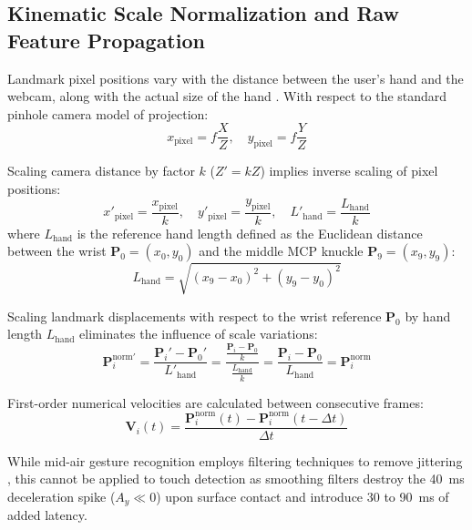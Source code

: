 \subsection{Kinematic Scale Normalization and Raw Feature Propagation}
\label{subsec:lit_scale_norm}
Landmark pixel positions vary with the distance between the user's hand and the webcam, along with the actual size of the hand \cite{Doan2022Efficient, Kumar2026Hybrid}. With respect to the standard pinhole camera model of projection:
\begin{equation}
x_{\text{pixel}} = f \frac{X}{Z}, \quad y_{\text{pixel}} = f \frac{Y}{Z}
\label{eq:pinhole_projection}
\end{equation}

Scaling camera distance by factor $k$ ($Z' = k Z$) implies inverse scaling of pixel positions:
\begin{equation}
x'_{\text{pixel}} = \frac{x_{\text{pixel}}}{k}, \quad y'_{\text{pixel}} = \frac{y_{\text{pixel}}}{k}, \quad L'_{\text{hand}} = \frac{L_{\text{hand}}}{k}
\label{eq:pixel_scaling}
\end{equation}
where $L_{\text{hand}}$ is the reference hand length defined as the Euclidean distance between the wrist $\mathbf{P}_0 = (x_0, y_0)$ and the middle MCP knuckle $\mathbf{P}_9 = (x_9, y_9)$:
\begin{equation}
L_{\text{hand}} = \sqrt{(x_9 - x_0)^2 + (y_9 - y_0)^2}
\label{eq:hand_length_scale_def}
\end{equation}

Scaling landmark displacements with respect to the wrist reference $\mathbf{P}_0$ by hand length $L_{\text{hand}}$ eliminates the influence of scale variations:
\begin{equation}
\mathbf{P}_i^{\text{norm}\prime} = \frac{\mathbf{P}_i' - \mathbf{P}_0'}{L'_{\text{hand}}} = \frac{\frac{\mathbf{P}_i - \mathbf{P}_0}{k}}{\frac{L_{\text{hand}}}{k}} = \frac{\mathbf{P}_i - \mathbf{P}_0}{L_{\text{hand}}} = \mathbf{P}_i^{\text{norm}}
\label{eq:scale_invariance_proof}
\end{equation}

First-order numerical velocities are calculated between consecutive frames:
\begin{equation}
\mathbf{V}_i(t) = \frac{\mathbf{P}_i^{\text{norm}}(t) - \mathbf{P}_i^{\text{norm}}(t - \Delta t)}{\Delta t}
\label{eq:joint_velocity_def}
\end{equation}

While mid-air gesture recognition employs filtering techniques to remove jittering \cite{Kumar2026Hybrid}, this cannot be applied to touch detection as smoothing filters destroy the 40~ms deceleration spike ($A_y \ll 0$) upon surface contact and introduce 30 to 90~ms of added latency.

